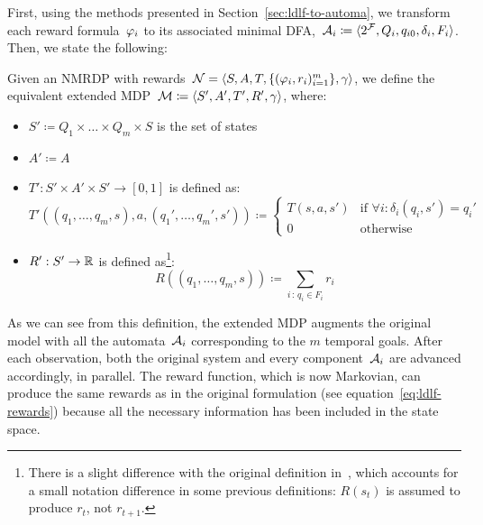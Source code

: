 First, using the methods presented in Section~\ref{sec:ldlf-to-automa}, we
transform each reward formula~$\varphi_i$ to its associated minimal
DFA,~${\mathcal{A}_i \coloneqq \langle 2^{\mathcal{F}}, Q_i, q_{i0}, \delta_i, F_i
\rangle}$. Then, we state the following:
\begin{definition}
	\cite{bib:degiacomo-logic-nmrdp} Given an NMRDP with \ldl{} rewards~$\mathcal{N}
	= \langle S, A, T, \{(\varphi_i, r_i)_{i=1}^m\},\allowbreak \gamma
	\rangle$, we define the equivalent extended MDP~$\mathcal{M} \coloneqq {\langle
	S', A', T', R', \gamma\rangle}$, where:
	\begin{itemize}
		\item $S' \coloneqq Q_1 \times \dots \times Q_m \times S$ is the set of
			states
		\item $A' \coloneqq A$
		\item $T' : S' \times A' \times S' \to [0, 1]$ is defined as:
			\[
				T'((q_1, \dots, q_m, s), a, (q_1', \dots, q_m', s')) \coloneqq
				\begin{cases}
					T(s, a, s') & \text{if $\forall i : \delta_i(q_i, s') = q_i'$} \\
					0 & \text{otherwise}
				\end{cases}
			\]
		\item $R' : S' \to \mathbb{R}$ is defined as\footnote{There is a slight difference
			with the original definition in~\cite{bib:degiacomo-logic-nmrdp}, which
			accounts for a small notation difference in some previous definitions:
			$R(s_t)$ is assumed to produce $r_t$, not $r_{t+1}$.}:
			\[
				R((q_1, \dots, q_m, s)) \coloneqq \sum_{i\, :\, q_i \in F_i} r_i
			\]
	\end{itemize}
	\label{def:ldlf-eq-mdp}
\end{definition}
As we can see from this definition, the extended MDP augments the original
model with all the automata~$\mathcal{A}_i$ corresponding to the $m$ temporal
goals. After each observation, both the original system and every
component~$\mathcal{A}_i$ are advanced accordingly, in parallel. The reward
function, which is now Markovian, can produce the same rewards as in the
original formulation (see equation~\eqref{eq:ldlf-rewards}) because all the
necessary information has been included in the state space.

